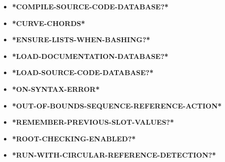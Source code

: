 \documentclass [11pt]{book}
\begin{document}
\begin{itemize}
\item {}
\label{prim:*compile-source-code-database?*}
\textbf{*COMPILE-SOURCE-CODE-DATABASE?*}





\item {}
\label{prim:*curve-chords*}
\textbf{*CURVE-CHORDS*}





\item {}
\label{prim:*ensure-lists-when-bashing?*}
\textbf{*ENSURE-LISTS-WHEN-BASHING?*}





\item {}
\label{prim:*load-documentation-database?*}
\textbf{*LOAD-DOCUMENTATION-DATABASE?*}





\item {}
\label{prim:*load-source-code-database?*}
\textbf{*LOAD-SOURCE-CODE-DATABASE?*}





\item {}
\label{prim:*on-syntax-error*}
\textbf{*ON-SYNTAX-ERROR*}





\item {}
\label{prim:*out-of-bounds-sequence-reference-action*}
\textbf{*OUT-OF-BOUNDS-SEQUENCE-REFERENCE-ACTION*}





\item {}
\label{prim:*remember-previous-slot-values?*}
\textbf{*REMEMBER-PREVIOUS-SLOT-VALUES?*}





\item {}
\label{prim:*root-checking-enabled?*}
\textbf{*ROOT-CHECKING-ENABLED?*}





\item {}
\label{prim:*run-with-circular-reference-detection?*}
\textbf{*RUN-WITH-CIRCULAR-REFERENCE-DETECTION?*}






\end{itemize}
\end{document}

